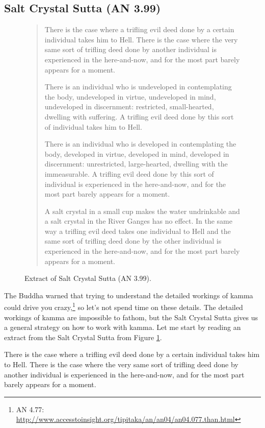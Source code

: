 \subsection*{Salt Crystal Sutta (AN 3.99)}

\begin{figure}[H]
\begin{quotation}
There is the case where a trifling evil deed done by a certain individual takes him to Hell. There is the case where the very same sort of trifling deed done by another individual is experienced in the here-and-now, and for the most part barely appears for a moment.

There is an individual who is undeveloped in contemplating the body, undeveloped in virtue, undeveloped in mind, undeveloped in discernment: restricted, small-hearted, dwelling with suffering. A trifling evil deed done by this sort of individual takes him to Hell.

There is an individual who is developed in contemplating the body, developed in virtue, developed in mind, developed in discernment: unrestricted, large-hearted, dwelling with the immeasurable. A trifling evil deed done by this sort of individual is experienced in the here-and-now, and for the most part barely appears for a moment. 

A salt crystal in a small cup makes the water undrinkable and a salt crystal in the River Ganges has no effect. In the same way a trifling evil deed takes one individual to Hell and the same sort of trifling deed done by the other individual is experienced in the here-and-now, and for the most part barely appears for a moment.
\end{quotation}
\caption{Extract of Salt Crystal Sutta (AN 3.99).}
\label{fig:AN3_99}
\end{figure}

The Buddha warned that trying to understand the detailed workings of kamma could drive you crazy,\footnote{AN 4.77: \url{http://www.accesstoinsight.org/tipitaka/an/an04/an04.077.than.html}} so let’s not spend time on these details. The detailed workings of kamma are impossible to fathom, but the Salt Crystal Sutta gives us a general strategy on how to work with kamma. Let me start by reading an extract from the Salt Crystal Sutta from Figure \ref{fig:AN3_99}.

There is the case where a trifling evil deed done by a certain individual takes him to Hell. There is the case where the very same sort of trifling deed done by another individual is experienced in the here-and-now, and for the most part barely appears for a moment.

